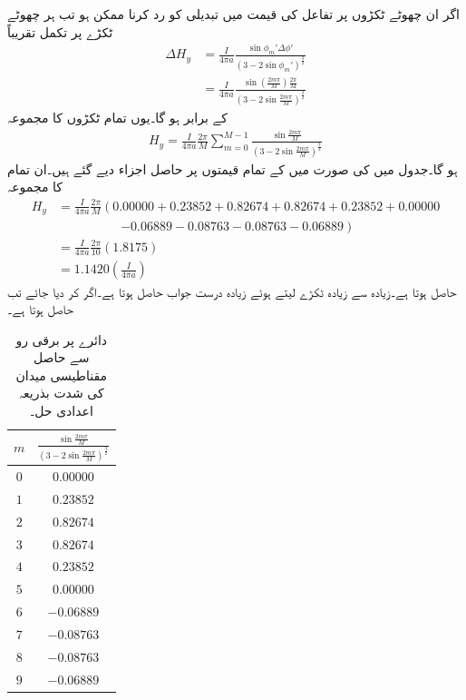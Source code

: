 اگر ان چھوٹے ٹکڑوں پر تفاعل کی قیمت میں تبدیلی کو رد کرنا ممکن ہو تب ہر چھوٹے ٹکڑے پر تکمل تقریباً
\begin{align*}
\Delta H_y&=\frac{I}{4\pi a} \frac{\sin \phi_m' \Delta \phi'}{\left(3-2\sin \phi_m'\right)^{\frac{3}{2}}} \\
&=\frac{I}{4\pi a} \frac{\sin (\frac{2 m \pi}{M}) \frac{2\pi}{M}}{\left(3-2\sin   \frac{2 m \pi}{M}\right)^{\frac{3}{2}}} 
\end{align*}
کے برابر ہو گا۔یوں تمام ٹکڑوں کا مجموعہ
\begin{align*}
H_y= \frac{I}{4\pi a} \frac{2\pi}{M} \sum_{m=0}^{M-1}\frac{\sin  \frac{2 m \pi}{M} }{\left(3-2\sin  \frac{2 m \pi}{M}\right)^{\frac{3}{2}}}
\end{align*}
ہو گا۔جدول  میں  کی صورت میں  کے تمام قیمتوں پر حاصل   اجزاء دیے گئے ہیں۔ان تمام کا مجموعہ
\begin{align*}
H_y&=\frac{I}{4\pi a} \frac{2\pi}{M} \left(0.00000+0.23852 +  0.82674 +  0.82674  + 0.23852  + 0.00000 \right.  \\
& \quad \quad \quad \quad \quad \left.-0.06889  -0.08763  -0.08763  -0.06889\right)\\
&=\frac{I}{4\pi a}\frac{2\pi}{10} (1.8175)\\
&=1.1420 \left(\frac{ I}{4\pi a}\right)
\end{align*}
حاصل ہوتا ہے۔زیادہ سے زیادہ ٹکڑے لیتے ہوئے زیادہ درست جواب حاصل ہوتا ہے۔اگر  کر دیا جائے تب   حاصل ہوتا ہے۔
\begin{table}
\centering
\begin{tabular}{c c}
$m$& $\frac{\sin  \frac{2 m \pi}{M}}{\left(3-2\sin  \frac{2 m \pi}{M}\right)^{\frac{3}{2}}}$\\[3ex]
\hline
$0$& $0.00000$\\
$1$& $0.23852$\\
$2$&$0.82674 $\\
$3$& $0.82674$\\
$4$& $0.23852$\\
$5$& $0.00000$\\
$6$& $-0.06889$\\
$7$&$-0.08763$\\
$8$& $ -0.08763$\\
$9$& $-0.06889$
\end{tabular}
\caption{دائرے پر برقی رو سے حاصل مقناطیسی میدان کی شدت بذریعہ اعدادی حل۔}
\label{جدول_مقناطیسی_دائرہ_مقناطیسی_شدت_عددی_حل}
\end{table}

